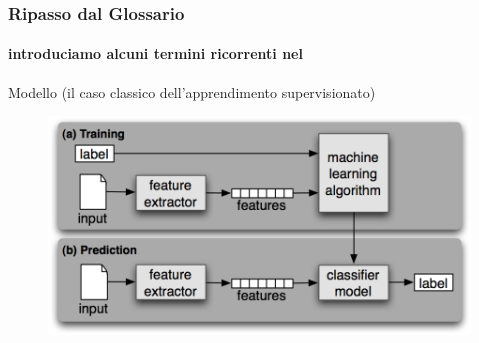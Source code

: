 \begin{frame}
	
	\frametitle{Ripasso dal Glossario}
	\framesubtitle{introduciamo alcuni termini ricorrenti nel \ml}
	
	\begin{block}{Modello (il caso classico dell'apprendimento supervisionato)}
		\begin{figure}[!htbp]
			\centering
			\includegraphics[width=11.2cm]{images/glossary/supervised_learning_2.png}
		\end{figure}
		
	\end{block}

\end{frame}
